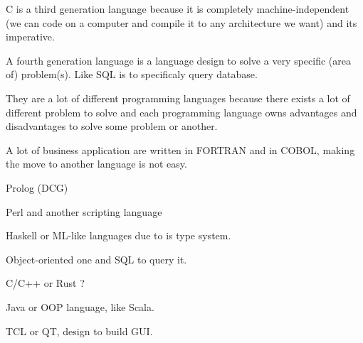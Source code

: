 \documentclass[a4paper,11pt]{article}
\begin{document}
\begin{tcolorbox}[title=Why do we call C a ``Third Generation Language'' ?]
  C is a third generation language because it is completely machine-independent
  (we can code on a computer and compile it to any architecture we want) and its
  imperative.
\end{tcolorbox}
\begin{tcolorbox}[title=What is a ``Fourth Generation Language'' ?]
  A fourth generation language is a language design to solve a very specific
  (area of) problem(s). Like SQL is to specificaly query database.
\end{tcolorbox}
\begin{tcolorbox}[title=Why are there so many programming languages ?]
  They are a lot of different programming languages because there exists a lot
  of different problem to solve and each programming language owns advantages
  and disadvantages to solve some problem or another.
\end{tcolorbox}
\begin{tcolorbox}[title=Why are FORTRAN and COBOL still important programming
  languages ?]
  A lot of business application are written in FORTRAN and in COBOL, making the
  move to another language is not easy.
\end{tcolorbox}
\begin{tcolorbox}[title=Which language should you use to implement a spelling
  checker ?]
  Prolog (DCG)
\end{tcolorbox}
\begin{tcolorbox}[title=Which language should you use to implement a filter to
  translate upper-to-lower case ?]
  Perl and another scripting language
\end{tcolorbox}
\begin{tcolorbox}[title=Which language should you use to implement a theorem
  prover ?]
  Haskell or ML-like languages due to is type system.
\end{tcolorbox}
\begin{tcolorbox}[title=Which language should you use to implement an address
  database ?]
  Object-oriented one and SQL to query it.
\end{tcolorbox}
\begin{tcolorbox}[title=Which language should you use to implement an expert
  system ?]
  C/C++ or Rust ?
\end{tcolorbox}
\begin{tcolorbox}[title=Which language should you use to implement a game server
  for initiating chess games on the internet ?]
  Java or OOP language, like Scala.
\end{tcolorbox}
\begin{tcolorbox}[title=Which language should you use to implement a user
  interface for a network chess client ?]
  TCL or QT, design to build GUI.
\end{tcolorbox}
\end{document}
